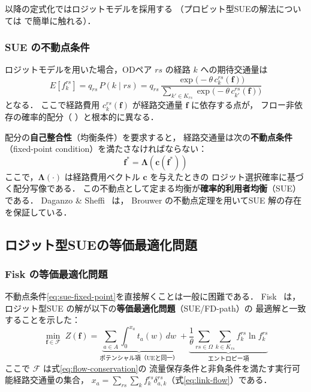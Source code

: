 以降の定式化ではロジットモデルを採用する
（プロビット型SUEの解法については  で簡単に触れる）．

\subsubsection*{SUE の不動点条件}

ロジットモデルを用いた場合，ODペア $rs$ の経路 $k$ への期待交通量は
\begin{equation}
  E\!\left[f_k^{rs}\right]
    = q_{rs}\, P(k \mid rs)
    = q_{rs}\,
      \frac{\exp\!\bigl(-\theta\, c_k^{rs}(\boldsymbol{f})\bigr)}
           {\displaystyle\sum_{k' \in K_{rs}}
            \exp\!\bigl(-\theta\, c_{k'}^{rs}(\boldsymbol{f})\bigr)}
  \label{eq:sue-expected-flow}
\end{equation}
となる．
ここで経路費用 $c_k^{rs}(\boldsymbol{f})$ が経路交通量 $\boldsymbol{f}$ に依存する点が，
フロー非依存の確率的配分（ ）と根本的に異なる．

配分の\textbf{自己整合性}（均衡条件）を要求すると，
経路交通量は次の\textbf{不動点条件}（fixed-point condition）を満たさなければならない\cite{Daganzo1977}：
\begin{equation}
  \boldsymbol{f}^* = \boldsymbol{\Lambda}\!\left(\boldsymbol{c}(\boldsymbol{f}^*)\right)
  \label{eq:sue-fixed-point}
\end{equation}
ここで，$\boldsymbol{\Lambda}(\cdot)$ は経路費用ベクトル $\boldsymbol{c}$ を与えたときの
ロジット選択確率に基づく配分写像である．
この不動点として定まる均衡が\textbf{確率的利用者均衡}（SUE）である．
Daganzo \& Sheffi~\cite{Daganzo1977} は，
Brouwer の不動点定理を用いてSUE 解の存在を保証している．

\subsection{ロジット型SUEの等価最適化問題}
\label{subsec:sue-optimization}

\subsubsection*{Fisk の等価最適化問題}

不動点条件\eqref{eq:sue-fixed-point}を直接解くことは一般に困難である．
Fisk~\cite{Fisk1980} は，
ロジット型SUE の解が以下の\textbf{等価最適化問題}（SUE/FD-path）の
最適解と一致することを示した：
\begin{equation}
  \min_{\boldsymbol{f} \in \mathcal{F}}\;
    Z(\boldsymbol{f})
    = \underbrace{\sum_{a \in A} \int_0^{x_a} t_a(w)\,dw}_{\text{ポテンシャル項（UEと同一）}}
    + \underbrace{\frac{1}{\theta}
      \sum_{rs \in \Omega}\sum_{k \in K_{rs}}
      f_k^{rs} \ln f_k^{rs}}_{\text{エントロピー項}}
  \label{eq:sue-opt}
\end{equation}
ここで $\mathcal{F}$ は式\eqref{eq:flow-conservation}の
流量保存条件と非負条件を満たす実行可能経路交通量の集合，
$x_a = \sum_{rs}\sum_k f_k^{rs} \delta_{a,k}^{rs}$（式\eqref{eq:link-flow}）である．

